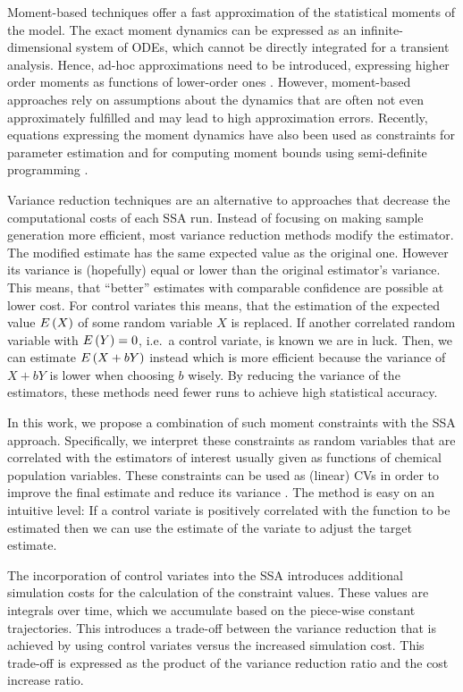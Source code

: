 Moment-based techniques offer a fast approximation of the statistical moments of the model. 
The exact moment dynamics can be expressed as an infinite-dimensional system of \acp{ODE}, which cannot be directly  integrated for a transient analysis.
Hence, ad-hoc approximations need to be introduced, expressing higher order moments as functions of lower-order ones \parencite{ale2013general,engblom2006computing}.
However, moment-based approaches rely on assumptions about the dynamics that are
often not even approximately fulfilled and may lead to high approximation errors. 
Recently, equations expressing the moment dynamics have also been used as constraints for parameter
estimation \parencite{backenkohler2018moment} and for computing moment bounds using semi-definite programming \parencite{dowdy2018dynamic,ghusinga2017exact}.

Variance reduction techniques are an alternative to approaches that decrease the computational costs of each SSA run.
Instead of focusing on making sample generation more efficient, most variance reduction methods modify the estimator.
The modified estimate has the same expected value as the original one.
However its variance is (hopefully) equal or lower than the original estimator's variance.
This means, that ``better'' estimates with comparable confidence are possible at lower cost.
For control variates this means, that the estimation of the expected value ${E}\left(X\right)$ of some random variable $X$ is replaced.
If another correlated random variable with ${E}\left(Y\right)=0$, i.e.\ a control variate, is known we are in luck.
Then, we can estimate ${E}\left(X+bY\right)$ instead which is more efficient because the variance of $X+bY$ is lower when choosing $b$ wisely.
By reducing the variance of the estimators, these methods need fewer runs to achieve high statistical accuracy.

In this work, we propose a combination of such moment constraints with the \ac{SSA} approach.
Specifically, we   interpret these constraints as random variables 
that are correlated with the estimators of interest usually given as functions of chemical population variables.
These constraints can be used  as  (linear) \acfp{CV} in order to improve the final estimate and reduce its variance \parencite{lavenberg1982statistical,szechtman2003control}.
The method is easy on an intuitive level: If a control variate
is positively correlated with the function to be estimated then 
we can use the estimate of the variate to
adjust the target estimate.

The incorporation of control variates into the \ac{SSA}
introduces   additional simulation costs for the calculation of the constraint values.
These values are integrals over time, which we accumulate  based on the
piece-wise constant trajectories.
This introduces a trade-off between the variance reduction that is achieved
by using control variates versus the increased simulation cost.
This trade-off is expressed as the product of the variance reduction ratio
and the cost increase ratio.

